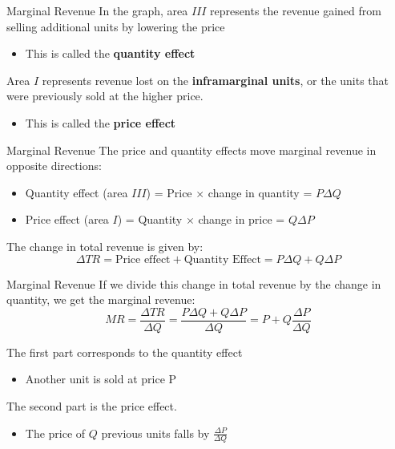 \documentclass[11pt,t]{beamer}
\begin{document}
\begin{frame}{Marginal Revenue}
  In the graph, area $III$ represents the revenue gained from selling additional units by lowering the price

  \begin{itemize}
    \item This is called the \textbf{quantity effect}
  \end{itemize}

  \bigskip
  Area $I$ represents revenue lost on the \textbf{inframarginal units}, or the units that were previously sold at the higher price.

  \begin{itemize}
    \item This is called the \textbf{price effect}
  \end{itemize}
\end{frame}

\begin{frame}{Marginal Revenue}
  The price and quantity effects move marginal revenue in opposite directions:

  \begin{itemize}
    \item Quantity effect (area $III$) = Price $\times$ change in quantity = $P \Delta Q$
    
    \item Price effect (area $I$) = Quantity $\times$ change in price = $Q \Delta P$
  \end{itemize}


  \bigskip\pause
  The change in total revenue is given by:
  $$
    \Delta TR = \text{Price effect} + \text{Quantity Effect} = P\Delta Q + Q\Delta P
  $$
\end{frame}

\begin{frame}{Marginal Revenue}
  If we divide this change in total revenue by the change in quantity, we get the marginal revenue:
  $$
    MR = \frac{\Delta TR}{\Delta Q} = \frac{P\Delta Q + Q\Delta P}{\Delta Q}=P+Q\frac{\Delta P}{\Delta Q}
  $$
  
  \bigskip
  The first part corresponds to the quantity effect
  \begin{itemize}
    \item Another unit is sold at price P
  \end{itemize}
  
  \bigskip
  The second part is the price effect.
  \begin{itemize}
    \item The price of $Q$ previous units falls by $\frac{\Delta P}{\Delta Q}$
  \end{itemize}
\end{frame}
\end{document}
